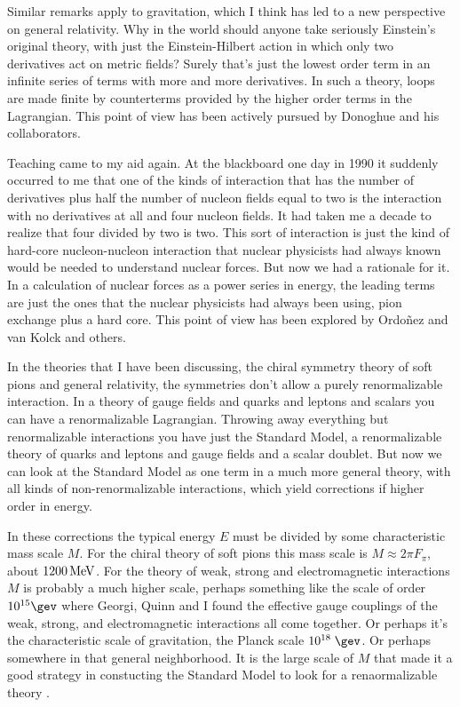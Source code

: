 Similar remarks apply to gravitation, which I think has led to a new perspective on general relativity.   Why in the world should anyone take seriously Einstein's original theory, with just the Einstein-Hilbert action in which  only two derivatives act on metric fields? Surely that's just the lowest order term in an infinite series of terms with more and more derivatives.  In such a theory,   loops are made finite by counterterms provided by the higher order terms in the Lagrangian. This   point of view   has been actively pursued by Donoghue and his collaborators. 

Teaching came to my aid again.  At the blackboard one day in 1990 it suddenly occurred to me that one of the kinds of interaction that has the number of derivatives plus half the number of nucleon fields equal to two is the interaction with no derivatives at all and four nucleon fields. It had taken me a decade to realize that four divided by two is two. This sort of interaction  is just the kind of hard-core nucleon-nucleon interaction that nuclear physicists had always known would be needed to understand nuclear forces. But now we had a rationale for it. In a calculation of nuclear forces as a power series in energy, the leading terms are just the ones that the nuclear physicists had always been using, pion exchange plus a hard core.  This point of view has been explored by Ordo\~{n}ez and van Kolck and others.

In the theories that I have been discussing, the chiral symmetry theory of soft pions and general relativity, the symmetries don't allow a purely renormalizable interaction. In a theory of gauge fields and quarks and leptons and scalars you can have a renormalizable Lagrangian.  Throwing away everything but renormalizable interactions you have just the Standard Model, a renormalizable theory of quarks and leptons and gauge fields and a scalar doublet. But now we can look at the Standard Model as one term  in a much more general theory, with all kinds of non-renormalizable interactions, which yield corrections if  higher order in energy.  

In these corrections the typical energy $E$ must be divided by some characteristic  mass scale $M$. For the chiral theory of soft pions this mass scale is  $M\approx 2\pi F_\pi$, about $1200\,{\rm MeV}$. For the theory of weak, strong and electromagnetic interactions $M$ is probably a much higher scale, perhaps something like the scale of order $10^{15}\gev$ where Georgi, Quinn and I found the effective gauge couplings of the weak, strong, and electromagnetic interactions  all come together. Or perhaps it's the characteristic scale of gravitation, the Planck scale $10^{18}\;\gev$.  Or perhaps  somewhere in that general neighborhood.  It is the large scale of $M$ that made it a good strategy in constucting the Standard Model to look for a renaormalizable theory .

